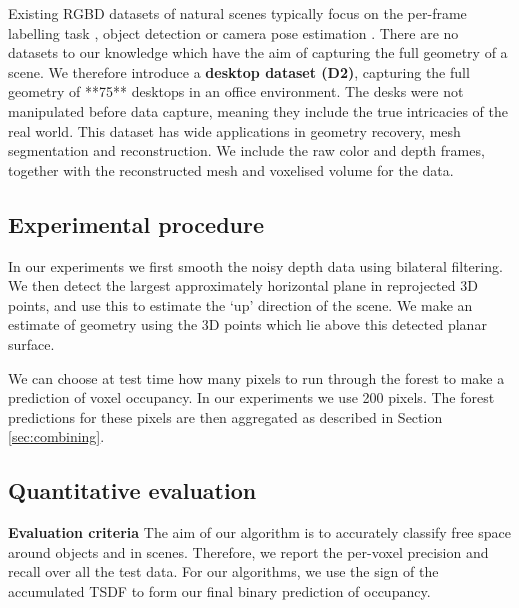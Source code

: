 \documentclass[10pt,twocolumn,letterpaper]{article}
\renewcommand{\paragraph}{\vspace{2pt}\noindent\textbf}
\begin{document}
Existing RGBD datasets of natural scenes typically focus on the per-frame labelling task \cite{nyu, sun3d}, object detection \cite{rgbd scenes dataset} or camera pose estimation \cite{stanford?}.
There are no datasets to our knowledge which have the aim of capturing the full geometry of a scene.
We therefore introduce a \textbf{desktop dataset (D2)}, capturing the full geometry of **75** desktops in an office environment.
The desks were not manipulated before data capture, meaning they include the true intricacies of the real world.
This dataset has wide applications in geometry recovery, mesh segmentation and reconstruction.
We include the raw color and depth frames, together with the reconstructed mesh and voxelised volume for the data.


\subsection{Experimental procedure}

In our experiments we first smooth the noisy depth data using bilateral filtering.
We then detect the largest approximately horizontal plane in reprojected 3D points, and use this to estimate the `up' direction of the scene.
We make an estimate of geometry using the 3D points which lie above this detected planar surface.

We can choose at test time how many pixels to run through the forest to make a prediction of voxel occupancy.
In our experiments we use 200 pixels.
The forest predictions for these pixels are then aggregated as described in Section \ref{sec:combining}.



\subsection{Quantitative evaluation}

\paragraph{Evaluation criteria}
The aim of our algorithm is to accurately classify free space around objects and in scenes.
Therefore, we report the per-voxel precision and recall over all the test data.
For our algorithms, we use the sign of the accumulated TSDF to form our final binary prediction of occupancy.
\end{document}
